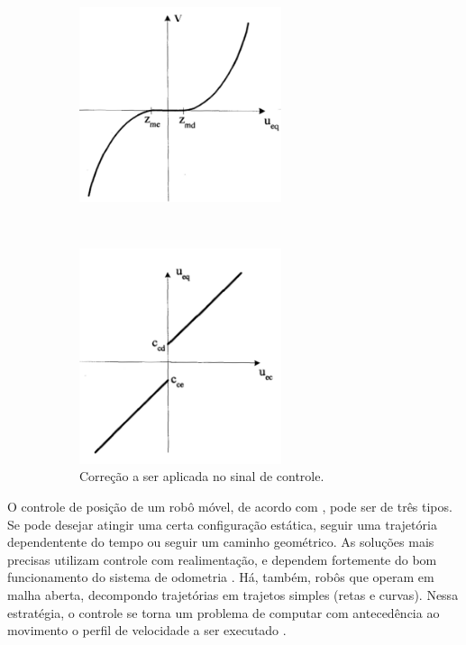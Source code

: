 \begin{figure}[h]
    \centering
    \begin{subfigure}[t]{0.5\textwidth}
        \centering
        \includegraphics[width = 0.65\textwidth]{imagens/zonamorta0a}
        \label{fig:cont_zma}
    \end{subfigure}%
    ~
    \begin{subfigure}[t]{0.5\textwidth}
        \centering
        \includegraphics[width = 0.65\textwidth]{imagens/zonamorta0b}
        \caption{Correção a ser aplicada no sinal de controle.}
        \label{fig:cont_zmb}
    \end{subfigure}
    \caption{ }
    \label{fig:cont_zm}
\end{figure}

O controle de posição de um robô móvel, de acordo com \citet{siegwart2011introduction}, pode ser de três tipos. Se pode desejar atingir uma certa configuração estática, seguir uma trajetória dependentente do tempo ou seguir um caminho geométrico. As soluções mais precisas utilizam controle com realimentação, e dependem fortemente do bom funcionamento do sistema de odometria \citep{samani2007comprehensive}. Há, também, robôs que operam em malha aberta, decompondo trajetórias em trajetos simples (retas e curvas). Nessa estratégia, o controle se torna um problema de computar com antecedência ao movimento o perfil de velocidade a ser executado \citep{siegwart2011introduction}.

